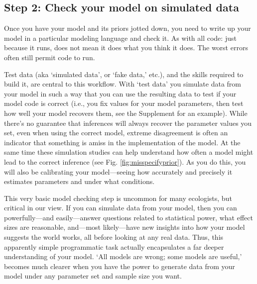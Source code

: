 \documentclass[11pt]{article}
\begin{document}
\subsection*{Step 2: Check your model on simulated data} 

Once you have your model and its priors jotted down, you need to write up your model in a particular modeling language and check it. As with all code: just because it runs, does not mean it does what you think it does. The worst errors often still permit code to run. %

Test data (aka `simulated data', or  `fake data,' etc.), and the skills required to build it, are central to this workflow. With `test data' you simulate data from your model in such a way that you can use the resulting data to test if your model code is correct (i.e., you fix values for your model parameters, then test how well your model recovers them, see the Supplement for an example). While there's no guarantee that inferences will always recover the parameter values you set, even when using the correct model, extreme disagreement is often an indicator that something is amiss in the implementation of the model. At the same time these simulation studies can help understand how often a model might lead to the correct inference (see Fig. \ref{fig:misspecifyprior}). As you do this, you will also be calibrating your model---seeing how accurately and precisely it estimates parameters and under what conditions. 

This very basic model checking step is uncommon for many ecologists, but critical in our view. If you can simulate data from your model, then you can powerfully---and easily---answer questions related to statistical power, what effect sizes are reasonable, and---most likely---have new insights into how your model suggests the world works, all before looking at any real data. Thus, this apparently simple programmatic task actually encapsulates a far deeper understanding of your model. `All models are wrong; some models are useful,' becomes much clearer when you have the power to generate data from your model under any parameter set and sample size you want. %
\end{document}
